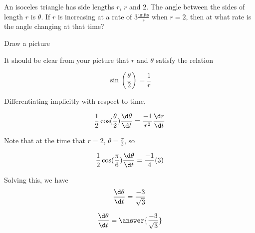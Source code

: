 \documentclass{ximera}
\author{Steven Gubkin}
\begin{document}
\begin{exercise}



An isoceles triangle has side lengths $r$, $r$ and $2$.  The angle between the sides of length $r$ is $\theta$.  If $r$ is increasing at a rate of $3 \frac{\textrm{units}}{\textrm{s}}$ when $r = 2$, then at what rate is the angle changing at that time?

\begin{hint}
	Draw a picture
\end{hint}

\begin{hint}
	It should be clear from your picture that $r$ and $\theta$ satisfy the relation 

\[\sin(\frac{\theta}{2}) = \frac{1}{r}\]
\end{hint}

\begin{hint}
	Differentiating implicitly with respect to time, 

\[
	\frac{1}{2}\cos(\frac{\theta}{2}) \frac{\d \theta}{\d t} = \frac{-1}{r^2} \frac{\d r}{\d t}
\]
\end{hint}

\begin{hint}
	Note that at the time that $r = 2$, $\theta = \frac{\pi}{3}$, so

	\[\frac{1}{2} \cos(\frac{\pi}{6}) \frac{\d \theta}{\d t} = \frac{-1}{4} (3)\]
\end{hint}

\begin{hint}
	Solving this, we have
\[
	\frac{\d \theta}{\d t} =  \frac{-3}{\sqrt{3}}
\]
\end{hint}

\begin{prompt}
	\[
	\frac{\d \theta}{\d t} =  \answer{\frac{-3}{\sqrt{3}}}
	\]
\end{prompt}

\end{exercise}
\end{document}

